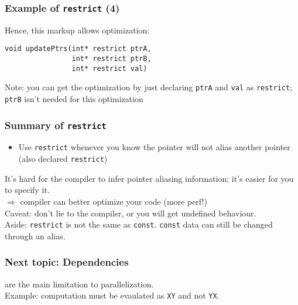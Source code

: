 \documentclass[aspectratio=43]{beamer}
\newenvironment{changemargin}[1]{%
  \begin{list}{}{%
    \setlength{\topsep}{0pt}%
    \setlength{\leftmargin}{#1}%
    \setlength{\rightmargin}{1em}
    \setlength{\listparindent}{\parindent}%
    \setlength{\itemindent}{\parindent}%
    \setlength{\parsep}{\parskip}%
  }%
  \item[]}{\end{list}}
\begin{document}
\begin{frame}[fragile]
  \frametitle{Example of {\tt restrict} (4)}
  \begin{changemargin}{2.5cm}
  Hence, this markup allows optimization:
  \begin{lstlisting}
void updatePtrs(int* restrict ptrA, 
                int* restrict ptrB,
                int* restrict val)
  \end{lstlisting}
  Note: you can get the optimization by just declaring {\tt ptrA} and
      {\tt val} as {\tt restrict}; {\tt ptrB} isn't needed for this optimization
  \end{changemargin}
\end{frame}

\begin{frame}[fragile]
  \frametitle{Summary of {\tt restrict}}

  \begin{changemargin}{2.5cm}
  \begin{itemize}
    \item Use {\tt restrict} whenever you know the pointer will not alias
      another pointer (also declared {\tt restrict})
  \end{itemize}

    It's hard for the compiler to infer pointer aliasing information;
    it's easier for you to specify it.\\[1em]

    $\Rightarrow$ compiler can better optimize your code (more perf!)\\[1em]

    Caveat: don't lie to the compiler, or  you will get
      \alert{undefined behaviour}.\\[1em]

    Aside: {\tt restrict} is not the same as {\tt const}. {\tt const} data can still be
      changed through an alias.
  \end{changemargin}
\end{frame}

\begin{frame}
  \frametitle{Next topic: Dependencies}

  \Large
  \begin{changemargin}{2.5cm}
      are the main
      limitation to parallelization.\\[1em]
     Example: computation must be evaulated as {\tt XY} and not {\tt YX}.\\[1em]
  \end{changemargin}
\end{frame}
\end{document}
